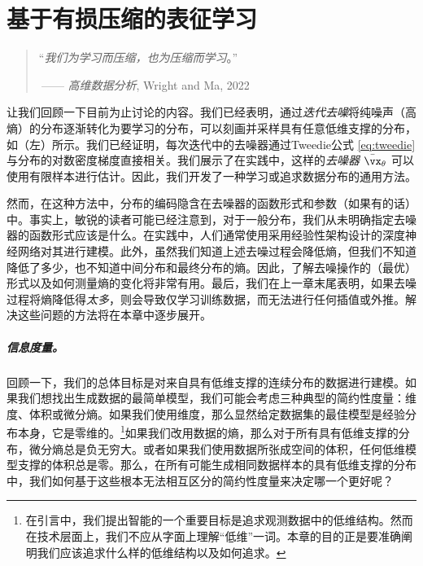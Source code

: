 \documentclass[../../book-main_zh.tex]{subfiles}
\begin{document}
\chapter{基于有损压缩的表征学习}
\label{ch:lossy-compression}

\begin{quote}
    \hfill ``\textit{我们为学习而压缩，也为压缩而学习}。''
    
    $~$\hfill —— \textit{高维数据分析}, Wright and Ma, 2022
\end{quote}
\vspace{5mm}

让我们回顾一下目前为止讨论的内容。我们已经表明，通过\textit{迭代去噪}将纯噪声（高熵）的分布逐渐转化为要学习的分布，可以刻画并采样具有任意低维支撑的分布，如（左）所示。我们已经证明，每次迭代中的去噪器通过Tweedie公式 \eqref{eq:tweedie} 与分布的对数密度梯度直接相关。我们展示了在实践中，这样的\textit{去噪器} \(\bar{\vx}_{\theta}\) 可以使用有限样本进行估计。因此，我们开发了一种学习或追求数据分布的通用方法。

然而，在这种方法中，分布的编码隐含在去噪器的函数形式和参数（如果有的话）中。事实上，敏锐的读者可能已经注意到，对于一般分布，我们从未明确指定去噪器的函数形式应该是什么。在实践中，人们通常使用采用经验性架构设计的深度神经网络对其进行建模。此外，虽然我们知道上述去噪过程会降低熵，但我们不知道降低了多少，也不知道中间分布和最终分布的熵。因此，了解去噪操作的（最优）形式以及如何测量熵的变化将非常有用。最后，我们在上一章末尾表明，如果去噪过程将熵降低得\textit{太多}，则会导致仅学习训练数据，而无法进行任何插值或外推。解决这些问题的方法将在本章中逐步展开。

\paragraph{信息度量。}
回顾一下，我们的总体目标是对来自具有低维支撑的连续分布的数据进行建模。如果我们想找出生成数据的最简单模型，我们可能会考虑三种典型的简约性度量：维度、体积或微分熵。如果我们使用维度，那么显然给定数据集的最佳模型是经验分布本身，它是零维的。\footnote{在引言中，我们提出智能的一个重要目标是追求观测数据中的低维结构。然而在技术层面上，我们不应从字面上理解“低维”一词。本章的目的正是要准确阐明我们应该追求什么样的低维结构以及如何追求。}如果我们改用数据的熵，那么对于所有具有低维支撑的分布，微分熵总是负无穷大。或者如果我们使用数据所张成空间的体积，任何低维模型支撑的体积总是零。那么，在所有可能生成相同数据样本的具有低维支撑的分布中，我们如何基于这些根本无法相互区分的简约性度量来决定哪一个更好呢？
\end{document}
